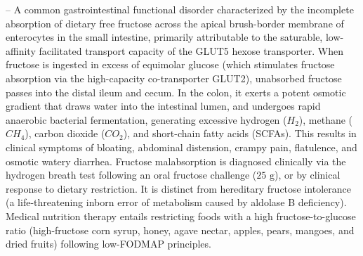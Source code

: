 -- A common gastrointestinal functional disorder characterized by the incomplete absorption of dietary free fructose across the apical brush-border membrane of enterocytes in the small intestine, primarily attributable to the saturable, low-affinity facilitated transport capacity of the GLUT5 hexose transporter. When fructose is ingested in excess of equimolar glucose (which stimulates fructose absorption via the high-capacity co-transporter GLUT2), unabsorbed fructose passes into the distal ileum and cecum. In the colon, it exerts a potent osmotic gradient that draws water into the intestinal lumen, and undergoes rapid anaerobic bacterial fermentation, generating excessive hydrogen ($H_2$), methane ($CH_4$), carbon dioxide ($CO_2$), and short-chain fatty acids (SCFAs). This results in clinical symptoms of bloating, abdominal distension, crampy pain, flatulence, and osmotic watery diarrhea. Fructose malabsorption is diagnosed clinically via the hydrogen breath test following an oral fructose challenge ($25\text{ g}$), or by clinical response to dietary restriction. It is distinct from hereditary fructose intolerance (a life-threatening inborn error of metabolism caused by aldolase B deficiency). Medical nutrition therapy entails restricting foods with a high fructose-to-glucose ratio (high-fructose corn syrup, honey, agave nectar, apples, pears, mangoes, and dried fruits) following low-FODMAP principles.

